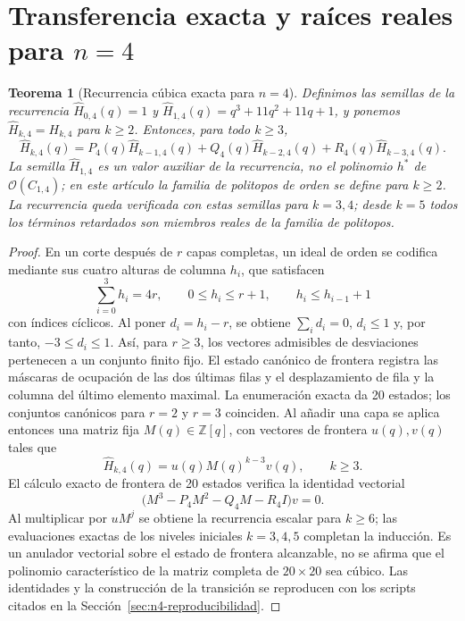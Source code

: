 \documentclass[11pt,a4paper]{article}
\newtheorem{theorem}{Teorema}[section]
\theoremstyle{definition}
\begin{document}
\section{Transferencia exacta y raíces reales para $n=4$}
\label{sec:n4-exact}

\begin{theorem}[Recurrencia cúbica exacta para $n=4$]
\label{thm:n4-transfer}
Definimos las semillas de la recurrencia
$\widehat H_{0,4}(q)=1$ y
$\widehat H_{1,4}(q)=q^3+11q^2+11q+1$, y ponemos
$\widehat H_{k,4}=H_{k,4}$ para $k\ge2$. Entonces, para todo $k\ge3$,
\[
\widehat H_{k,4}(q)=P_4(q)\widehat H_{k-1,4}(q)
+Q_4(q)\widehat H_{k-2,4}(q)+R_4(q)\widehat H_{k-3,4}(q).
\]
La semilla $\widehat H_{1,4}$ es un valor auxiliar de la recurrencia,
no el polinomio $h^*$ de $\mathcal O(C_{1,4})$; en este artículo la
familia de politopos de orden se define para $k\ge2$. La recurrencia
queda verificada con estas semillas para $k=3,4$; desde $k=5$ todos los
términos retardados son miembros reales de la familia de politopos.
\end{theorem}

\begin{proof}
En un corte después de $r$ capas completas, un ideal de orden se
codifica mediante sus cuatro alturas de columna $h_i$, que satisfacen
\[
\sum_{i=0}^3h_i=4r,\qquad 0\le h_i\le r+1,\qquad
h_i\le h_{i-1}+1
\]
con índices cíclicos. Al poner $d_i=h_i-r$, se obtiene
$\sum_i d_i=0$, $d_i\le1$ y, por tanto, $-3\le d_i\le1$. Así, para
$r\ge3$, los vectores admisibles de desviaciones pertenecen a un
conjunto finito fijo. El estado canónico de frontera registra las
máscaras de ocupación de las dos últimas filas y el desplazamiento de
fila y la columna del último elemento maximal. La enumeración exacta da
20 estados; los conjuntos canónicos para $r=2$ y $r=3$ coinciden. Al
añadir una capa se aplica entonces una matriz fija
$M(q)\in\mathbb Z[q]$, con vectores de frontera $u(q),v(q)$ tales que
\[
\widehat H_{k,4}(q)=u(q)M(q)^{k-3}v(q),\qquad k\ge3.
\]
El cálculo exacto de frontera de 20 estados verifica la identidad
vectorial
\[
\bigl(M^3-P_4M^2-Q_4M-R_4I\bigr)v=0.
\]
Al multiplicar por $uM^j$ se obtiene la recurrencia escalar para
$k\ge6$; las evaluaciones exactas de los niveles iniciales $k=3,4,5$
completan la inducción. Es un anulador vectorial sobre el estado de
frontera alcanzable, no se afirma que el polinomio característico de la
matriz completa de $20\times20$ sea cúbico. Las identidades y la
construcción de la transición se reproducen con los scripts citados en
la Sección~\ref{sec:n4-reproducibilidad}.
\end{proof}
\end{document}
